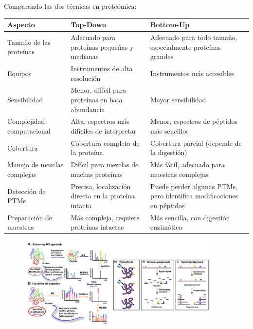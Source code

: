 Comparando las dos técnicas en proteómica:
\begin{table}[h]
\centering
\begin{tabular}{p{4cm}|p{5cm}p{5cm}}
Aspecto & Top-Down & Bottom-Up \\ \hline
Tamaño de las proteínas & Adecuado para proteínas pequeñas y medianas & Adecuado para todo tamaño, especialmente proteínas grandes \\
Equipos & Instrumentos de alta resolución & Instrumentos más accesibles \\
Sensibilidad & Menor, difícil para proteínas en baja abundancia & Mayor sensibilidad \\
Complejidad computacional & Alta, espectros más difíciles de interpretar & Menor, espectros de péptidos más sencillos \\
Cobertura & Cobertura completa de la proteína & Cobertura parcial (depende de la digestión) \\
Manejo de mezclas complejas & Difícil para mezclas de muchas proteínas & Más fácil, adecuado para muestras complejas \\
Detección de PTMs & Precisa, localización directa en la proteína intacta & Puede perder algunas PTMs, pero identifica modificaciones en péptidos \\
Preparación de muestras & Más compleja, requiere proteínas intactas & Más sencilla, con digestión enzimática
\end{tabular}
\end{table}

\begin{figure}[h]
\centering
\includegraphics[width = 0.9\textwidth]{figs/topdown-vs-bottomup.png}
\end{figure}

